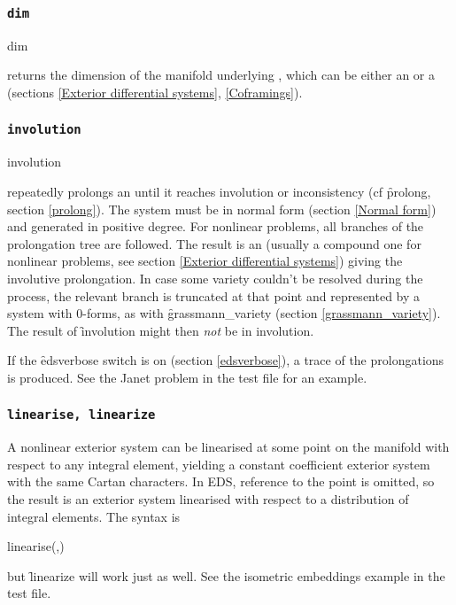 \subsubsection{\tt dim}
\label{dim}

\begin{edssyntax}
	dim 
\end{edssyntax}
returns the dimension of the manifold underlying ,
which can be either an  or a  (sections \ref{Exterior
differential systems}, \ref{Coframings}).

\subsubsection{\tt involution}
\label{involution}

\begin{edssyntax}
	involution 
\end{edssyntax}
repeatedly prolongs an  until it reaches involution or
inconsistency (cf \f{prolong}, section \ref{prolong}). The system must be
in normal form (section \ref{Normal form}) and generated in positive
degree. For nonlinear problems, all branches of the prolongation tree are
followed. The result is an  (usually a compound one for
nonlinear problems, see section \ref{Exterior differential systems})
giving the involutive prolongation. In case some variety couldn't be
resolved during the process, the relevant branch is truncated at that point
and represented by a system with 0-forms, as with \f{grassmann\_variety}
(section \ref{grassmann_variety}). The result of \f{involution} might then
{\em not} be in involution.

If the \f{edsverbose} switch is on (section \ref{edsverbose}), a trace of
the prolongations is produced. See the Janet problem in the test file for
an example.

\subsubsection{\tt linearise, linearize}
\label{linearise}

A nonlinear exterior system can be linearised at some point on the
manifold with respect to any integral element, yielding a constant
coefficient exterior system with the same Cartan characters. In EDS,
reference to the point is omitted, so the result is an exterior system
linearised with respect to a distribution of integral elements. The syntax
is
\begin{edssyntax}
	linearise(,)
\end{edssyntax}
but \f{linearize} will work just as well. See the isometric embeddings
example in the test file.

